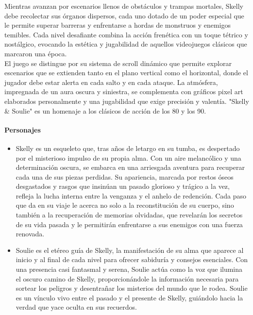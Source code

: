 \documentclass[12pt,a4paper,twoside,spanish]{article}      %
\begin{document}
Mientras avanzan por escenarios llenos de obstáculos y trampas mortales, Skelly debe recolectar sus órganos dispersos, cada uno dotado de un poder especial que le permite superar barreras y enfrentarse a hordas de monstruos y enemigos temibles. Cada nivel desafiante combina la acción frenética con un toque tétrico y nostálgico, evocando la estética y jugabilidad de aquellos videojuegos clásicos que marcaron una época.\\

El juego se distingue por su sistema de scroll dinámico que permite explorar escenarios que se extienden tanto en el plano vertical como el horizontal, donde el jugador debe estar alerta en cada salto y en cada ataque. La atmósfera, impregnada de un aura oscura y siniestra, se complementa con gráficos pixel art elaborados personalmente y una jugabilidad que exige precisión y valentía. "Skelly & Soulie" es un homenaje a los clásicos de acción de los 80 y los 90.

\paragraph{Personajes}
\begin{itemize}
    \item Skelly es un esqueleto que, tras años de letargo en su tumba, es despertado por el misterioso impulso de su propia alma. Con un aire melancólico y una determinación oscura, se embarca en una arriesgada aventura para recuperar cada una de sus piezas perdidas. Su apariencia, marcada por restos óseos desgastados y rasgos que insinúan un pasado glorioso y trágico a la vez, refleja la lucha interna entre la venganza y el anhelo de redención. Cada paso que da en su viaje le acerca no solo a la reconstitución de su cuerpo, sino también a la recuperación de memorias olvidadas, que revelarán los secretos de su vida pasada y le permitirán enfrentarse a sus enemigos con una fuerza renovada.
    \item Soulie es el etéreo guía de Skelly, la manifestación de su alma que aparece al inicio y al final de cada nivel para ofrecer sabiduría y consejos esenciales. Con una presencia casi fantasmal y serena, Soulie actúa como la voz que ilumina el oscuro camino de Skelly, proporcionándole la información necesaria para sortear los peligros y desentrañar los misterios del mundo que le rodea. Soulie es un vínculo vivo entre el pasado y el presente de Skelly, guiándolo hacia la verdad que yace oculta en sus recuerdos.
\end{itemize}
\end{document}
